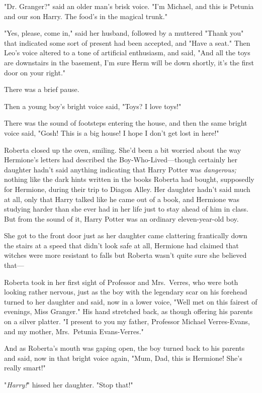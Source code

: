 "Dr. Granger?" said an older man's brisk voice. "I'm Michael, and this is
Petunia and our son Harry. The food's in the magical trunk."

"Yes, please, come in," said her husband, followed by a muttered "Thank you"
that indicated some sort of present had been accepted, and "Have a seat." Then
Leo's voice altered to a tone of artificial enthusiasm, and said, "And all the
toys are downstairs in the basement, I'm sure Herm will be down shortly, it's
the first door on your right."

There was a brief pause.

Then a young boy's bright voice said, "Toys? I love toys!"

There was the sound of footsteps entering the house, and then the same bright
voice said, "Gosh! This is a big house! I hope I don't get lost in here!"

Roberta closed up the oven, smiling. She'd been a bit worried about the way
Hermione's letters had described the Boy-Who-Lived---though certainly her
daughter hadn't said anything indicating that Harry Potter was
\emph{dangerous;} nothing like the dark hints written in the books Roberta had
bought, supposedly for Hermione, during their trip to Diagon Alley. Her
daughter hadn't said much at all, only that Harry talked like he came out of a
book, and Hermione was studying harder than she ever had in her life just to
stay ahead of him in class. But from the sound of it, Harry Potter was an
ordinary eleven-year-old boy.

She got to the front door just as her daughter came clattering frantically down
the stairs at a speed that didn't look safe at all, Hermione had claimed that
witches were more resistant to falls but Roberta wasn't quite sure she believed
that---

Roberta took in her first sight of Professor and Mrs.~Verres, who were both
looking rather nervous, just as the boy with the legendary scar on his forehead
turned to her daughter and said, now in a lower voice, "Well met on this
fairest of evenings, Miss Granger." His hand stretched back, as though offering
his parents on a silver platter. "I present to you my father, Professor Michael
Verres-Evans, and my mother, Mrs.~Petunia Evans-Verres."

And as Roberta's mouth was gaping open, the boy turned back to his parents and
said, now in that bright voice again, "Mum, Dad, this is Hermione! She's really
smart!"

"\emph{Harry!}" hissed her daughter. "Stop that!"

